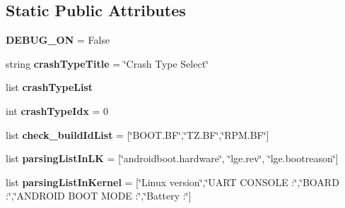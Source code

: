 \subsection*{Static Public Attributes}
\begin{DoxyCompactItemize}
\item 
\hypertarget{classsuker_r_d_a_1_1rda_pkg_1_1suker_r_d_a_body_1_1abstractor_body_af073c109887bf7c1122cfdb4ec05af58}{{\bfseries D\+E\+B\+U\+G\+\_\+\+O\+N} = False}\label{classsuker_r_d_a_1_1rda_pkg_1_1suker_r_d_a_body_1_1abstractor_body_af073c109887bf7c1122cfdb4ec05af58}

\item 
\hypertarget{classsuker_r_d_a_1_1rda_pkg_1_1suker_r_d_a_body_1_1abstractor_body_a755bf87cb057e4c0eaab673997df6443}{string {\bfseries crash\+Type\+Title} = \char`\"{}Crash Type Select\char`\"{}}\label{classsuker_r_d_a_1_1rda_pkg_1_1suker_r_d_a_body_1_1abstractor_body_a755bf87cb057e4c0eaab673997df6443}

\item 
list {\bfseries crash\+Type\+List}
\item 
\hypertarget{classsuker_r_d_a_1_1rda_pkg_1_1suker_r_d_a_body_1_1abstractor_body_aef2f16751fd39f5e9f063ecec5a351cc}{int {\bfseries crash\+Type\+Idx} = 0}\label{classsuker_r_d_a_1_1rda_pkg_1_1suker_r_d_a_body_1_1abstractor_body_aef2f16751fd39f5e9f063ecec5a351cc}

\item 
\hypertarget{classsuker_r_d_a_1_1rda_pkg_1_1suker_r_d_a_body_1_1abstractor_body_aa7fba24730ef3f1ded3778252af78930}{list {\bfseries check\+\_\+build\+Id\+List} = \mbox{[}\char`\"{}B\+O\+O\+T.\+B\+F\char`\"{},\char`\"{}T\+Z.\+B\+F\char`\"{},\char`\"{}R\+P\+M.\+B\+F\char`\"{}\mbox{]}}\label{classsuker_r_d_a_1_1rda_pkg_1_1suker_r_d_a_body_1_1abstractor_body_aa7fba24730ef3f1ded3778252af78930}

\item 
\hypertarget{classsuker_r_d_a_1_1rda_pkg_1_1suker_r_d_a_body_1_1abstractor_body_a0b1eb9dce5f0f92929cdb5536314b63c}{list {\bfseries parsing\+List\+In\+L\+K} = \mbox{[}\char`\"{}androidboot.\+hardware\char`\"{}, \char`\"{}lge.\+rev\char`\"{}, \char`\"{}lge.\+bootreason\char`\"{}\mbox{]}}\label{classsuker_r_d_a_1_1rda_pkg_1_1suker_r_d_a_body_1_1abstractor_body_a0b1eb9dce5f0f92929cdb5536314b63c}

\item 
\hypertarget{classsuker_r_d_a_1_1rda_pkg_1_1suker_r_d_a_body_1_1abstractor_body_a7b933813a156909674d919b75659c7fc}{list {\bfseries parsing\+List\+In\+Kernel} = \mbox{[}\char`\"{}Linux version\char`\"{},\char`\"{}U\+A\+R\+T C\+O\+N\+S\+O\+L\+E \+:\char`\"{},\char`\"{}B\+O\+A\+R\+D \+:\char`\"{},\char`\"{}A\+N\+D\+R\+O\+I\+D B\+O\+O\+T M\+O\+D\+E \+:\char`\"{},\char`\"{}Battery \+:\char`\"{}\mbox{]}}\label{classsuker_r_d_a_1_1rda_pkg_1_1suker_r_d_a_body_1_1abstractor_body_a7b933813a156909674d919b75659c7fc}


\end{DoxyCompactItemize}
